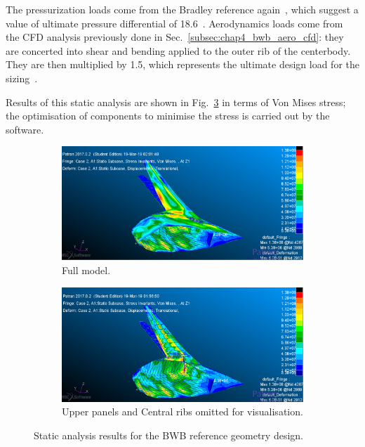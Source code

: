 The pressurization loads come from the Bradley reference again~\cite{bib:bradley_bwb}, which suggest a value of ultimate pressure differential of 18.6~\si{\psi}. 
Aerodynamics loads come from the CFD analysis previously done in Sec.~\ref{subsec:chap4_bwb_aero_cfd}: they are concerted into shear and bending applied to the outer rib of the centerbody. 
They are then multiplied by 1.5, which represents the ultimate design load for the sizing~\cite{bib:megson}. 

Results of this static analysis are shown in Fig.~\ref{fig:bwb_static_analysis_result} in terms of Von Mises stress; the optimisation of components to minimise the stress is carried out by the software. 
\begin{figure}[!h]
	\centering
	\begin{subfigure}{0.6\textwidth}
		\centering
		\includegraphics[keepaspectratio, width=\linewidth]{images/chap4/bwb_static_analysis_res_full_model.jpg}
		\caption{Full model.}
		\label{fig:bwb_static_analysis_full_model}
	\end{subfigure}
	\begin{subfigure}{0.6\textwidth}
		\centering
		\includegraphics[keepaspectratio, width=\linewidth]{images/chap4/bwb_static_analysis_res_detail.jpg}
		\caption{Upper panels and Central ribs omitted for visualisation.}
		\label{fig:bwb_static_analysis_detail}
	\end{subfigure}
	\caption{Static analysis results for the BWB reference geometry design.}
	\label{fig:bwb_static_analysis_result}
\end{figure}
